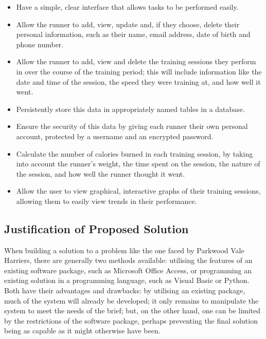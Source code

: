 \documentclass{article}[12pt,a4paper]
\begin{document}
\begin{itemize}
    \item Have a simple, clear interface that allows tasks to be performed easily.
    \item Allow the runner to add, view, update and, if they choose, delete their personal information, such as their name, email address, date of birth and phone number.
    \item Allow the runner to add, view and delete the training sessions they perform in over the course of the training period; this will include information like the date and time of the session, the speed they were training at, and how well it went.
    \item Persistently store this data in appropriately named tables in a database.
    \item Ensure the security of this data by giving each runner their own personal account, protected by a username and an encrypted password.
    \item Calculate the number of calories burned in each training session, by taking into account the runner's weight, the time spent on the session, the nature of the session, and how well the runner thought it went.
    \item Allow the user to view graphical, interactive graphs of their training sessions, allowing them to easily view trends in their performance.
\end{itemize}

\subsection{Justification of Proposed Solution}
When building a solution to a problem like the one faced by Parkwood Vale Harriers, there are generally two methods available: utilising the features of an existing software package, such as Microsoft Office Access, or programming an existing solution in a programming language, such as Visual Basic or Python. Both have their advantages and drawbacks: by utilising an existing package, much of the system will already be developed; it only remains to manipulate the system to meet the needs of the brief; but, on the other hand, one can be limited by the restrictions of the software package, perhaps preventing the final solution being as capable as it might otherwise have been.
\end{document}
